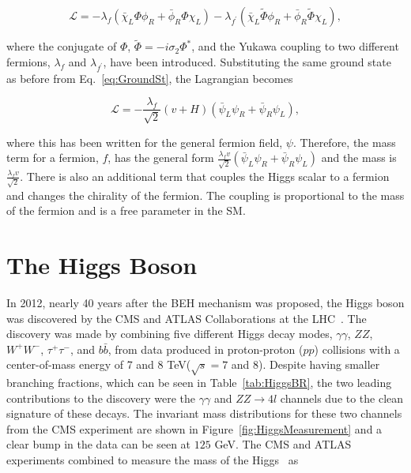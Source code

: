 \begin{equation}
\mathcal{L}= -\lambda_{f}(\bar{\chi}_{L}\Phi\phi_{R} + \bar{\phi}_{R}\Phi\chi_{L}) - \lambda_{f^{\prime}}(\bar{\chi}_{L}\widetilde{\Phi}\phi_{R} + \bar{\phi}_{R}\widetilde{\Phi}\chi_{L}),
\end{equation}

\noindent
where the conjugate of $\Phi$, $\widetilde{\Phi}=-i\sigma_{2}\Phi^{\ast}$, and the Yukawa coupling to two different fermions, $\lambda_{f}$ and $\lambda_{f^{\prime}}$, have been introduced. Substituting the same ground state as before from Eq.~\ref{eq:GroundSt}, the Lagrangian becomes


\begin{equation}
\mathcal{L}=-\frac{\lambda_{f}}{\sqrt{2}}(v+H)(\bar{\psi}_{L}\psi_{R} + \bar{\psi}_{R}\psi_{L}),
\end{equation}


\noindent
where this has been written for the general fermion field, $\psi$. Therefore, the mass term for a fermion, $f$, has the general form $\frac{\lambda_{f}v}{\sqrt{2}}(\bar{\psi}_{L}\psi_{R} +  \bar{\psi}_{R}\psi_{L})$ and the mass is $\frac{\lambda_{f}v}{\sqrt{2}}$. There is also an additional term that couples the Higgs scalar to a fermion and changes the chirality of the fermion. The coupling is proportional to the mass of the fermion and is a free parameter in the SM. 


\section{The Higgs Boson}

In 2012, nearly 40 years after the BEH mechanism was proposed, the Higgs boson was discovered by the CMS and ATLAS Collaborations at the LHC~\cite{ATLASHiggs, CMSHiggs}. The discovery was made by combining five different Higgs decay modes, $\gamma\gamma$, $ZZ$, $W^{+}W^{-}$, $\tau^{+}\tau^{-}$, and $b\bar{b}$, from data produced in proton-proton ($pp$) collisions with a center-of-mass energy of 7 and 8 TeV($\sqrt{s}=7$ and $8$). Despite having smaller branching fractions, which can be seen in Table~\ref{tab:HiggsBR}, the two leading contributions to the discovery were the $\gamma\gamma$ and $ZZ\rightarrow 4l$ channels due to the clean signature of these decays. The invariant mass distributions for these two channels from the CMS experiment are shown in Figure~\ref{fig:HiggsMeasurement} and a clear bump in the data can be seen at $125$ GeV. The CMS and ATLAS experiments combined to measure the mass of the Higgs~\cite{CombinedHiggs} as

